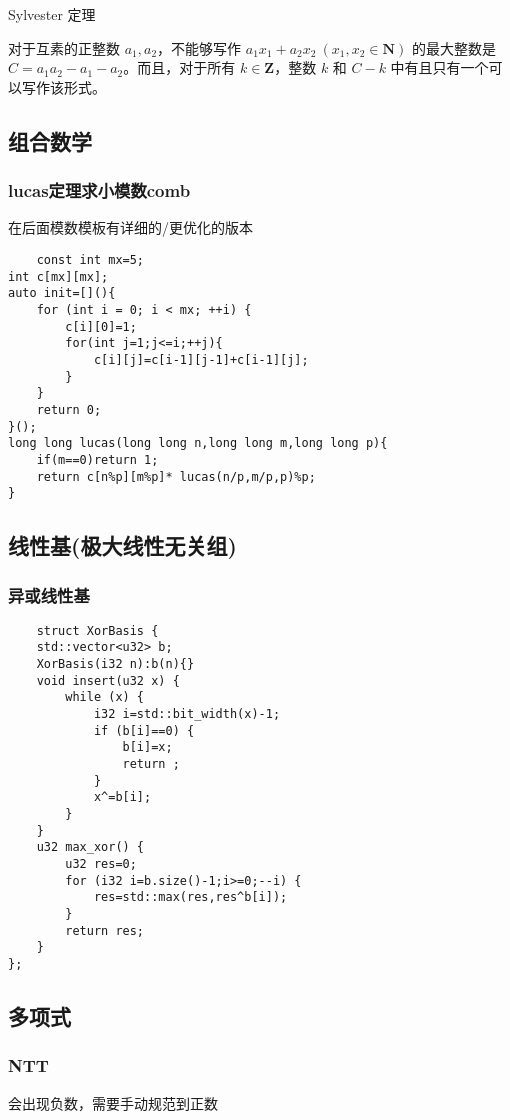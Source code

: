\documentclass[UTF8]{ctexart}
\begin{document}
Sylvester 定理

对于互素的正整数 $a_1,a_2$，不能够写作 $a_1x_1+a_2x_2~(x_1,x_2\in\mathbf N)$ 的最大整数是 $C = a_1a_2 - a_1 - a_2$。而且，对于所有 $k\in\mathbf Z$，整数 $k$ 和 $C-k$ 中有且只有一个可以写作该形式。
\subsection{组合数学}
\subsubsection{lucas定理求小模数comb}
在后面模数模板有详细的/更优化的版本
\begin{lstlisting}
    const int mx=5;
int c[mx][mx];
auto init=[](){
    for (int i = 0; i < mx; ++i) {
        c[i][0]=1;
        for(int j=1;j<=i;++j){
            c[i][j]=c[i-1][j-1]+c[i-1][j];
        }
    }
    return 0;
}();
long long lucas(long long n,long long m,long long p){
    if(m==0)return 1;
    return c[n%p][m%p]* lucas(n/p,m/p,p)%p;
}
\end{lstlisting}
\subsection{线性基(极大线性无关组)}
\subsubsection{异或线性基}
\begin{lstlisting}
    struct XorBasis {
    std::vector<u32> b;
    XorBasis(i32 n):b(n){}
    void insert(u32 x) {
        while (x) {
            i32 i=std::bit_width(x)-1;
            if (b[i]==0) {
                b[i]=x;
                return ;
            }
            x^=b[i];
        }
    }
    u32 max_xor() {
        u32 res=0;
        for (i32 i=b.size()-1;i>=0;--i) {
            res=std::max(res,res^b[i]);
        }
        return res;
    }
};
\end{lstlisting}
\subsection{多项式}
\subsubsection{NTT}
会出现负数，需要手动规范到正数
\end{document}

